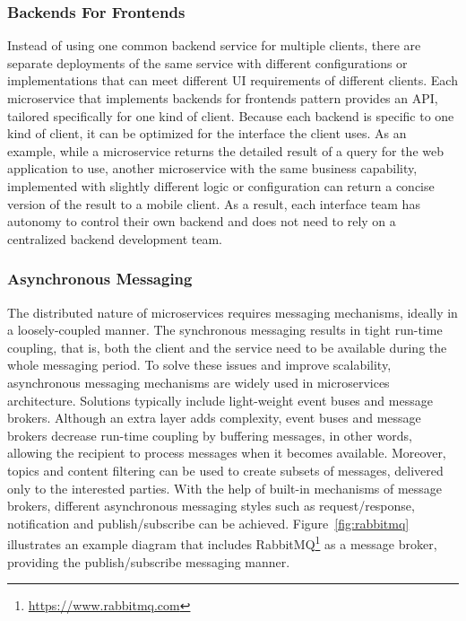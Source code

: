 \documentclass{Configuration_Files/PoliMi3i_thesis}
\begin{document}
\subsubsection{Backends For Frontends}
\label{subsubsec:bff}

Instead of using one common backend service for multiple clients, there are separate deployments of the same service with different configurations or implementations that can meet different UI requirements of different clients.
Each microservice that implements backends for frontends pattern provides an API, tailored specifically for one kind of client.
Because each backend is specific to one kind of client, it can be optimized for the interface the client uses.
As an example, while a microservice returns the detailed result of a query for the web application to use, another microservice with the same business capability, implemented with slightly different logic or configuration can return a concise version of the result to a mobile client.
As a result, each interface team has autonomy to control their own backend and does not need to rely on a centralized backend development team.

\subsubsection{Asynchronous Messaging}
\label{subsubsec:async_msg}

The distributed nature of microservices requires messaging mechanisms, ideally in a loosely-coupled manner.
The synchronous messaging results in tight run-time coupling, that is, both the client and the service need to be available during the whole messaging period.
To solve these issues and improve scalability, asynchronous messaging mechanisms are widely used in microservices architecture.
Solutions typically include light-weight event buses and message brokers.
Although an extra layer adds complexity, event buses and message brokers decrease run-time coupling by buffering messages, in other words, allowing the recipient to process messages when it becomes available.
Moreover, topics and content filtering can be used to create subsets of messages, delivered only to the interested parties.
With the help of built-in mechanisms of message brokers, different asynchronous messaging styles such as request/response, notification and publish/subscribe can be achieved.
Figure~\ref{fig:rabbitmq} illustrates an example diagram that includes RabbitMQ\footnote{\href{https://www.rabbitmq.com}{https://www.rabbitmq.com}} as a message broker, providing the publish/subscribe messaging manner.
\end{document}
